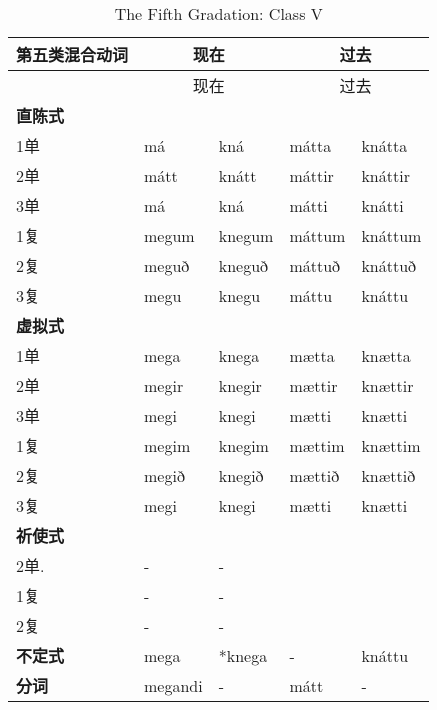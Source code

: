 \begin{longtable}{lllll}
  \caption[The Fifth Gradation: Class V]{The Fifth Gradation: Class
    V}\tabularnewline
  \toprule
  第五类混合动词      & \multicolumn{2}{c}{现在} & \multicolumn{2}{c}{过去}                    \\\midrule\endfirsthead{} &\multicolumn{2}{c}{现在} &\multicolumn{2}{c}{过去} \\
  \midrule
  \endhead
  \bottomrule
  \endfoot
  \textbf{直陈式} & ~                      & ~                      & ~      & ~       \\
  1单           & má                     & kná                    & mátta  & knátta  \\
  2单           & mátt                   & knátt                  & máttir & knáttir \\
  3单           & má                     & kná                    & mátti  & knátti  \\
  1复           & megum                  & knegum                 & máttum & knáttum \\
  2复           & meguð                  & kneguð                 & máttuð & knáttuð \\
  3复           & megu                   & knegu                  & máttu  & knáttu  \\
  \textbf{虚拟式} & ~                      & ~                      & ~      & ~       \\
  1单           & mega                   & knega                  & mætta  & knætta  \\
  2单           & megir                  & knegir                 & mættir & knættir \\
  3单           & megi                   & knegi                  & mætti  & knætti  \\
  1复           & megim                  & knegim                 & mættim & knættim \\
  2复           & megið                  & knegið                 & mættið & knættið \\
  3复           & megi                   & knegi                  & mætti  & knætti  \\
  \textbf{祈使式} & ~                      & ~                      & ~      & ~       \\
  2单.          & -                      & -                      & ~      & ~       \\
  1复           & -                      & -                      & ~      & ~       \\
  2复           & -                      & -                      & ~      & ~       \\
  \textbf{不定式} & mega                   & *knega                 & -      & knáttu  \\
  \textbf{分词}  & megandi                & -                      & mátt   & -       \\
\end{longtable}

